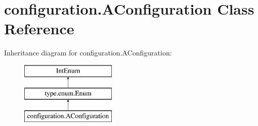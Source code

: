 \hypertarget{classconfiguration_1_1AConfiguration}{}\section{configuration.\+A\+Configuration Class Reference}
\label{classconfiguration_1_1AConfiguration}
Inheritance diagram for configuration.\+A\+Configuration\+:\begin{figure}[H]
\begin{center}
\leavevmode
\includegraphics[height=3.000000cm]{classconfiguration_1_1AConfiguration}
\end{center}
\end{figure}
